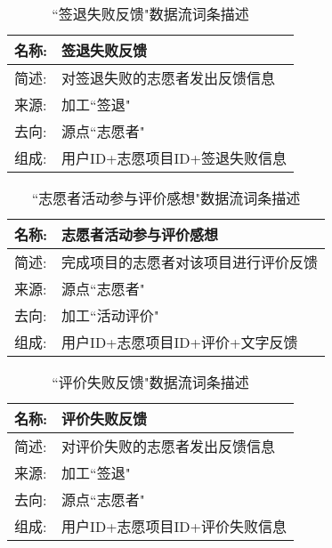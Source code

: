 \begin{table}[H]  
    \caption{``签退失败反馈"数据流词条描述}  
    \begin{center}  
        \begin{tabular}{l p{11cm}} 
            \hline
            \quad 名称: & 签退失败反馈 \\
            \hline
            \quad 简述: & 对签退失败的志愿者发出反馈信息 \\
            \hline
            \quad 来源: & 加工``签退" \\
            \hline
            \quad 去向: & 源点``志愿者" \\
            \hline
            \quad 组成: & 用户ID+志愿项目ID+签退失败信息  \\
            \hline
        \end{tabular}
        \label{tab1}
    \end{center}
    \end{table}


\begin{table}[H]  
    \caption{``志愿者活动参与评价感想"数据流词条描述}  
    \begin{center}  
        \begin{tabular}{l p{11cm}} 
            \hline
            \quad 名称: & 志愿者活动参与评价感想 \\
            \hline
            \quad 简述: & 完成项目的志愿者对该项目进行评价反馈 \\
            \hline
            \quad 来源: & 源点``志愿者" \\
            \hline
            \quad 去向: & 加工``活动评价" \\
            \hline
            \quad 组成: & 用户ID+志愿项目ID+评价+文字反馈  \\
            \hline
        \end{tabular}
        \label{tab1}
    \end{center}
    \end{table}


\begin{table}[H]  
    \caption{``评价失败反馈"数据流词条描述}  
    \begin{center}  
        \begin{tabular}{l p{11cm}} 
            \hline
            \quad 名称: & 评价失败反馈 \\
            \hline
            \quad 简述: & 对评价失败的志愿者发出反馈信息 \\
            \hline
            \quad 来源: & 加工``签退" \\
            \hline
            \quad 去向: & 源点``志愿者" \\
            \hline
            \quad 组成: & 用户ID+志愿项目ID+评价失败信息  \\
            \hline
        \end{tabular}
        \label{tab1}
    \end{center}
    \end{table}


